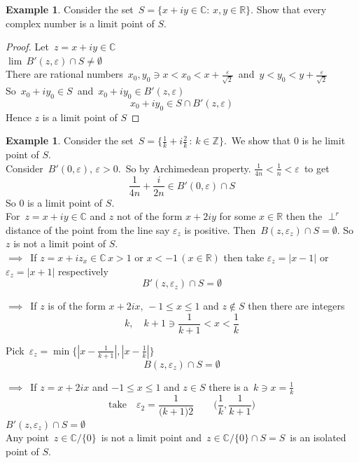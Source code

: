 \documentclass[11pt,a4paper]{article}
\theoremstyle{definition}
\newtheorem{example}[thm]{Example}
\begin{document}
\begin{example}
Consider the set $\, S = \big\{ x + iy\in \mathbb{C}: \, x,y\in \mathbb{R}\big\}$. Show that every complex number is a limit point of $S$.
\end{example}

\begin{proof}




Let $\, z = x  + i y \in \mathbb{C}$\\
$\lim\, B'(z,\varepsilon) \cap S \neq \emptyset$\\
There are rational numbers $\, x_0,y_0\ni x < x_0 < x + \frac{\varepsilon}{\sqrt{2}}\,$ and $\, y < y_0 < y + \frac{\varepsilon}{\sqrt{2}}$\\
So $\, x_0 + iy_0 \in S\,$ and $\, x_0 + iy_0 \in B'(z,\varepsilon)$
$$x_0 +iy_0 \in S\cap B'(z,\varepsilon)$$
Hence $z$ is a limit point of $S$
\end{proof}

\begin{example}
Consider the set $\, S = \Big\{ \frac{1}{k} + i\frac{2}{k}\,:\, k \in \mathbb{Z}\Big\}.\,$ We show that 0 is he limit point of $S$.\\



Consider $\, B'(0,\varepsilon) , \, \varepsilon > 0.\,$ So by Archimedean property. $\frac{1}{4n} < \frac{1}{n} < \varepsilon\,$ to get $$ \frac{1}{4n} + \frac{i}{2n} \in B'(0,\varepsilon) \cap S$$
So 0 is a limit point of $S$.\\

For $\, z = x + iy\in \mathbb{C}$ and $z$ not of the form $x + 2iy$ for some $x\in \mathbb{R}$ then the $\perp^r$ distance of the point from the line say $\varepsilon_z$ is positive.
Then $\, B(z,\varepsilon_z) \cap S = \emptyset$.
So $z$ is not a limit point of $S$.\\

$\implies\,$ If $z = x + iz_x \in\mathbb{C}\, x> 1$ or $x < -1 \, (x \in \mathbb{R})$ then take $\varepsilon_z = \left|x - 1\right|$ or $\varepsilon_z = \left|x + 1\right|$ respectively $$B'(z, \varepsilon_z) \cap S = \emptyset$$

$\implies\,$ If $z$ is of the form $x + 2ix, \, - 1 \leq x \leq 1$ and $z\not \in S$ then there are integers 
$$ k, \quad  k + 1 \ni \frac{1}{k + 1} < x < \frac{1}{k}$$









Pick $\, \varepsilon_z = \min\Big\{ \left|x - \frac{1}{k + 1}\right|, \left|x - \frac{1}{k}\right|\Big\}$
$$B(z,\varepsilon_z) \cap S = \emptyset$$


$\implies\,$ If $z = x + 2ix$ and $-1\leq x \leq 1$ and $z \in S$ there is a $\, k\ni x = \frac{1}{k}$
$$\text{take}\quad  \varepsilon_2 = \frac{1}{\big(k + 1\big)2}\qquad  \Bigg(\frac{1}{k},\frac{1}{k + 1}\Bigg)$$
$B'(z,\varepsilon_z) \cap S = \emptyset$\\
Any point  $\, z \in \mathbb{C}/\{0\}\,$ is not a limit point and $\, z \in \mathbb{C}/\{0\} \cap S = S\,$ is an isolated point of $S$.
\end{example}
\end{document}

